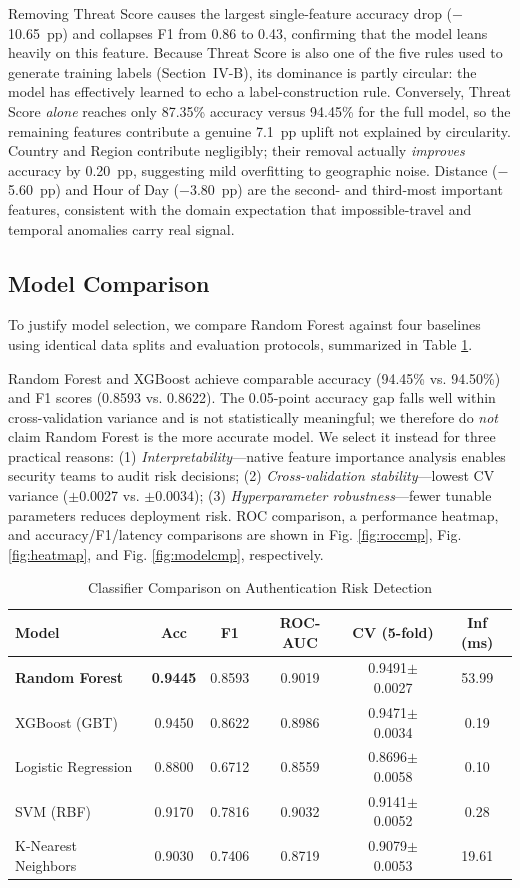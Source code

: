 \documentclass[conference]{IEEEtran}
\begin{document}
Removing Threat Score causes the largest single-feature accuracy drop ($-$10.65~pp) and collapses F1 from 0.86 to 0.43, confirming that the model leans heavily on this feature. Because Threat Score is also one of the five rules used to generate training labels (Section~IV-B), its dominance is partly circular: the model has effectively learned to echo a label-construction rule. Conversely, Threat Score \textit{alone} reaches only 87.35\% accuracy versus 94.45\% for the full model, so the remaining features contribute a genuine 7.1~pp uplift not explained by circularity. Country and Region contribute negligibly; their removal actually \textit{improves} accuracy by 0.20~pp, suggesting mild overfitting to geographic noise. Distance ($-$5.60~pp) and Hour of Day ($-$3.80~pp) are the second- and third-most important features, consistent with the domain expectation that impossible-travel and temporal anomalies carry real signal.

\subsection{Model Comparison}
To justify model selection, we compare Random Forest against four baselines using identical data splits and evaluation protocols, summarized in Table \ref{tab:compare}.

Random Forest and XGBoost achieve comparable accuracy (94.45\% vs. 94.50\%) and F1 scores (0.8593 vs. 0.8622). The 0.05-point accuracy gap falls well within cross-validation variance and is not statistically meaningful; we therefore do \textit{not} claim Random Forest is the more accurate model. We select it instead for three practical reasons: (1) \textit{Interpretability}---native feature importance analysis enables security teams to audit risk decisions; (2) \textit{Cross-validation stability}---lowest CV variance ($\pm$0.0027 vs. $\pm$0.0034); (3) \textit{Hyperparameter robustness}---fewer tunable parameters reduces deployment risk. ROC comparison, a performance heatmap, and accuracy/F1/latency comparisons are shown in Fig. \ref{fig:roccmp}, Fig. \ref{fig:heatmap}, and Fig. \ref{fig:modelcmp}, respectively.

\begin{table}[t]
\caption{Classifier Comparison on Authentication Risk Detection}
\label{tab:compare}
\centering
\setlength{\tabcolsep}{4pt}
\begin{tabular}{@{}lccccc@{}}
\toprule
Model & Acc & F1 & ROC-AUC & CV (5-fold) & Inf (ms) \\
\midrule
\textbf{Random Forest} & \textbf{0.9445} & 0.8593 & 0.9019 & 0.9491$\pm$0.0027 & 53.99 \\
XGBoost (GBT) & 0.9450 & 0.8622 & 0.8986 & 0.9471$\pm$0.0034 & 0.19 \\
Logistic Regression & 0.8800 & 0.6712 & 0.8559 & 0.8696$\pm$0.0058 & 0.10 \\
SVM (RBF) & 0.9170 & 0.7816 & 0.9032 & 0.9141$\pm$0.0052 & 0.28 \\
K-Nearest Neighbors & 0.9030 & 0.7406 & 0.8719 & 0.9079$\pm$0.0053 & 19.61 \\
\bottomrule
\end{tabular}
\end{table}
\end{document}
